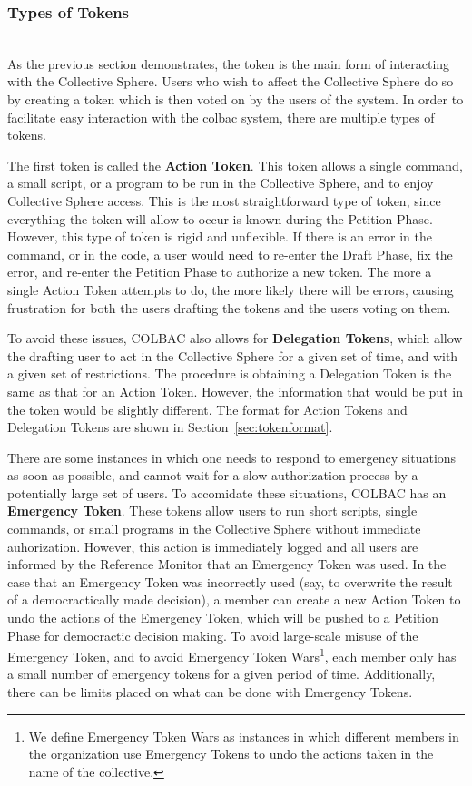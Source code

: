 \subsubsection{Types of Tokens}
\label{sec:tokentypes}
\mbox{}\\
As the previous section demonstrates, the token is the main form of interacting
with the Collective Sphere. Users who wish to affect the Collective Sphere do
so by creating a token which is then voted on by the users of the system. In
order to facilitate easy interaction with the colbac system, there are multiple
types of tokens.

The first token is called the \textbf{Action Token}. This token allows a single
command, a small script, or a program to be run in the Collective Sphere, and to
enjoy Collective Sphere access. This is the most straightforward type of token,
since everything the token will allow to occur is known during the Petition
Phase. However, this type of token is rigid and unflexible. If there is an error
in the command, or in the code, a user would need to re-enter the Draft Phase,
fix the error, and re-enter the Petition Phase to authorize a new token. The
more a single Action Token attempts to do, the more likely there will be errors,
causing frustration for both the users drafting the tokens and the users voting
on them.

To avoid these issues, COLBAC also allows for \textbf{Delegation Tokens}, which
allow the drafting user to act in the Collective Sphere for a given set of time,
and with a given set of restrictions. The procedure is obtaining a Delegation
Token is the same as that for an Action Token. However, the information that
would be put in the token would be slightly different. The format for Action
Tokens and Delegation Tokens are shown in Section~\ref{sec:tokenformat}.

There are some instances in which one needs to respond to emergency situations
as soon as possible, and cannot wait for a slow authorization process by a
potentially large set of users. To accomidate these situations, COLBAC has an
\textbf{Emergency Token}. These tokens allow users to run short scripts, single
commands, or small programs in the Collective Sphere without immediate
auhorization. However, this action is immediately logged and all users are
informed by the Reference Monitor that an Emergency Token was used. In the case
that an Emergency Token was incorrectly used (say, to overwrite the result of
a democractically made decision), a member can create a new Action Token to
undo the actions of the Emergency Token, which will be pushed to a Petition
Phase for democractic decision making. To avoid large-scale misuse of the
Emergency Token, and to avoid Emergency Token Wars\footnote{We define Emergency
Token Wars as instances in which different members in the organization use
Emergency Tokens to undo the actions taken in the name of the collective.},
each member only has a small number of emergency tokens for a given period of
time. Additionally, there can be limits placed on what can be done with 
Emergency Tokens.

